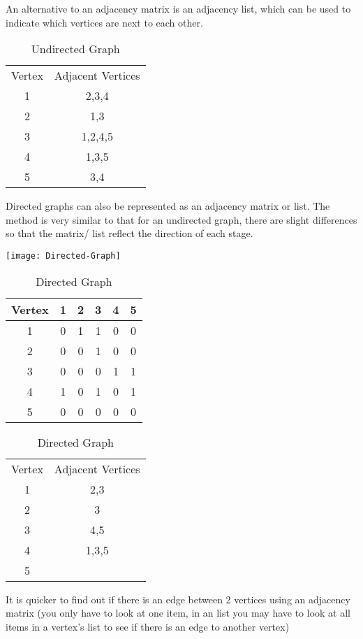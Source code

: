   An alternative to an adjacency matrix is an adjacency list, which can be used to indicate which vertices are next to each other.
  \begin{table}[H]
  	\caption{Undirected Graph}
  	\begin{tabular}{cc}
  		Vertex	&	Adjacent Vertices \\
  		1		&	2,3,4	\\
  		2		&	1,3	\\
  		3		&	1,2,4,5	\\
  		4		&	1,3,5	\\
  		5		&	3,4	\\
  	\end{tabular}
  \end{table}


  Directed graphs can also be represented as an adjacency matrix or list. The method is very similar to that for an undirected graph, there are slight differences so that the matrix/ list reflect the direction of each stage.

  \texttt{[image: Directed-Graph]}

  \begin{table}[H]
  	\caption{Directed Graph}
  	\begin{tabular}{c | c c c c c}
  		Vertex	&	1	&	2	&	3	&	4	&	5 	\\ \hline
  		1		&	0	&	1	&	1	&	0	&	0	\\
  		2		&	0	&	0	&	1	&	0	&	0	\\
  		3		&	0	&	0	&	0	&	1	&	1	\\
  		4		&	1	&	0	&	1	&	0	&	1	\\
  		5		&	0	&	0	&	0	&	0	&	0	\\
  	\end{tabular}
  \end{table}
  \begin{table}[H]
  	\caption{Directed Graph}
  	\begin{tabular}{cc}
  		Vertex	&	Adjacent Vertices \\
  		1		&	2,3	\\
  		2		&	3	\\
  		3		&	4,5	\\
  		4		&	1,3,5	\\
  		5		&		\\
  	\end{tabular}
  \end{table}


  It is quicker to find out if there is an edge between 2 vertices using an adjacency matrix (you only have to look at one item, in an list you may have to look at all items in a vertex's list to see if there is an edge to another vertex)

